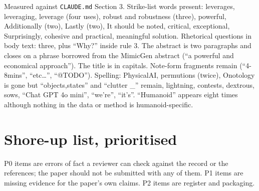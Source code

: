 \documentclass[
  11pt,
]{article}
\begin{document}
Measured against \texttt{CLAUDE.md} Section 3. Strike-list words
present: leverages, leveraging, leverage (four uses), robust and
robustness (three), powerful, Additionally (two), Lastly (two), It
should be noted, critical, exceptional, Surprisingly, cohesive and
practical, meaningful solution. Rhetorical questions in body text:
three, plus ``Why?'' inside rule 3. The abstract is two paragraphs and
closes on a phrase borrowed from the MimicGen abstract (``a powerful and
economical approach''). The title is in capitals. Note-form fragments
remain (``4-8mins'', ``etc\ldots{}'', ``@TODO''). Spelling: PhysicalAI,
permutions (twice), Onotology is gone but ``objects,states'' and
``clutter \_'' remain, lightning, contests, dextrous, sows, ``Chat GPT
4o mini'', ``we're'', ``it's''. ``Humanoid'' appears eight times
although nothing in the data or method is humanoid-specific.

\section{Shore-up list, prioritised}\label{shore-up-list-prioritised}

P0 items are errors of fact a reviewer can check against the record or
the references; the paper should not be submitted with any of them. P1
items are missing evidence for the paper's own claims. P2 items are
register and packaging.
\end{document}
